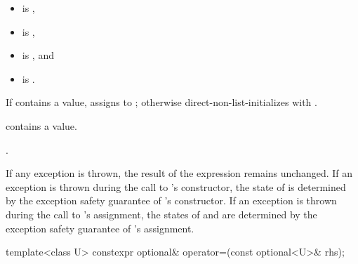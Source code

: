 \begin{itemdescr}
\pnum
\constraints
\begin{itemize}
\item {} is ,
\item {} is ,
\item {} is , and
\item {} is .
\end{itemize}

\pnum
\effects
If  contains a value, assigns  to ; otherwise direct-non-list-initializes  with .

\pnum
\ensures
{} contains a value.

\pnum
\returns
{}.

\pnum
\remarks
If any exception is thrown, the result of the expression  remains unchanged. If an exception is thrown during the call to 's constructor, the state of  is determined by the exception safety guarantee of 's constructor. If an exception is thrown during the call to 's assignment, the states of  and  are determined by the exception safety guarantee of 's assignment.
\end{itemdescr}

%
\begin{itemdecl}
template<class U>
  constexpr optional& operator=(const optional<U>& rhs);
\end{itemdecl}

